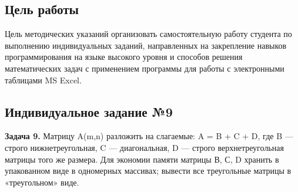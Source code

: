 \documentclass[a4paper,12pt]{article}
\begin{document}
\newpage
\begin{center}
\section*{Цель работы}
\end{center}
Цель методических указаний организовать самостоятельную работу студента по выполнению индивидуальных заданий, направленных на закрепление навыков программирования на языке высокого уровня и способов решения математических задач с применением программы для работы с электронными таблицами MS Excel.
\newpage
\begin{center}
\section*{Индивидуальное задание №9}
\end{center}
\textbf{Задача 9.} Матрицу A(m,n) разложить на слагаемые: A = B + C + D, где B — строго нижнетреугольная, C — диагональная, D — строго верхнетреугольная матрицы того же размера. Для экономии памяти матрицы В, С, D хранить в упакованном виде в одномерных массивах; вывести все треугольные матрицы в «треугольном» виде.
\newpage
\end{document}
